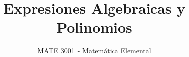 \documentclass[12pt]{article}
\newcommand{\coursecode}{MATE 3001}      %
\newcommand{\coursename}{Matemática Elemental}     %
\newcommand{\lessontitle}{Expresiones Algebraicas y Polinomios}    %
\newif\ifshowsolutions
\begin{document}
\title{\lessontitle}
\author{\coursecode\ - \coursename}
\date{}
\maketitle

\setcounter{section}{3}

         
       

\ifshowsolutions
    \newpage
    \section*{Soluciones}
    
\fi
\end{document}
